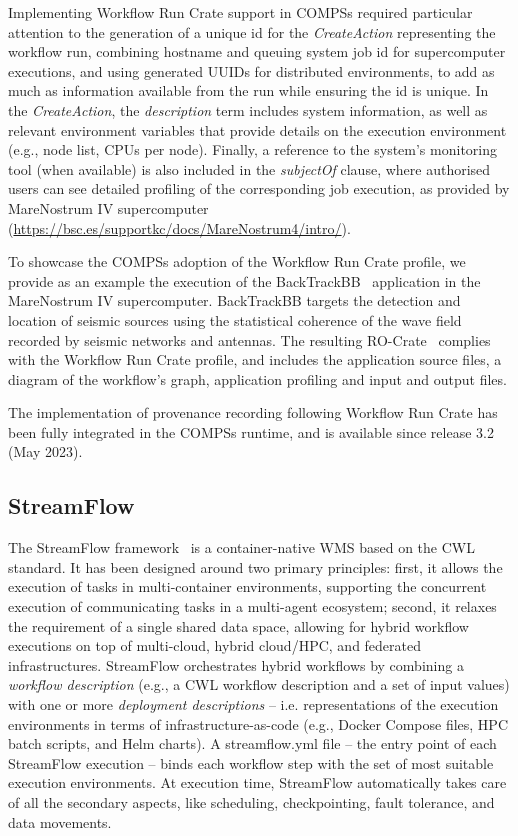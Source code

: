 \documentclass[10pt,letterpaper]{article}
\begin{document}
Implementing Workflow Run Crate support in COMPSs required particular attention to the generation of a unique id for the \emph{CreateAction} representing the workflow run, combining hostname and queuing system job id for supercomputer executions, and using generated UUIDs for distributed environments, to add as much as information available from the run while ensuring the id is unique.
In the \emph{CreateAction}, the \emph{description} term includes system information, as well as relevant environment variables that provide details on the execution environment (e.g., node list, CPUs per node).
Finally, a reference to the system's monitoring tool (when available) is also included in the \emph{subjectOf} clause, where authorised users can see detailed profiling of the corresponding job execution, as provided by MareNostrum IV supercomputer (\url{https://bsc.es/supportkc/docs/MareNostrum4/intro/}).

To showcase the COMPSs adoption of the Workflow Run Crate profile, we provide as an example the execution of the BackTrackBB~\cite{Poiata 2016}
application in the MareNostrum IV supercomputer.
BackTrackBB targets the detection and location of seismic sources using the statistical coherence of the wave field recorded by seismic networks and antennas.
The resulting RO-Crate~\cite{Poiata 2023} complies with the Workflow Run Crate profile, and includes the application source files, a diagram of the workflow's graph, application profiling and input and output files.

The implementation of provenance recording following Workflow Run Crate has been fully integrated in the COMPSs runtime, and is available since release 3.2 (May 2023).


\subsection{StreamFlow}\label{streamflow}

The StreamFlow framework~\cite{Colonnelli 2020} is a container-native WMS based on the CWL standard.
It has been designed around two primary principles: first, it allows the execution of tasks in multi-container environments, supporting the concurrent execution of communicating tasks in a multi-agent ecosystem; second, it relaxes the requirement of a single shared data space, allowing for hybrid workflow executions on top of multi-cloud, hybrid cloud/HPC, and federated infrastructures.
StreamFlow orchestrates hybrid workflows by combining a \emph{workflow description} (e.g., a CWL workflow description and a set of input values) with one or more \emph{deployment descriptions} -- i.e.
representations of the execution environments in terms of infrastructure-as-code (e.g., Docker Compose files, HPC batch scripts, and Helm charts).
A streamflow.yml file -- the entry point of each StreamFlow execution -- binds each workflow step with the set of most suitable execution environments.
At execution time, StreamFlow automatically takes care of all the secondary aspects, like scheduling, checkpointing, fault tolerance, and data movements.
\end{document}
